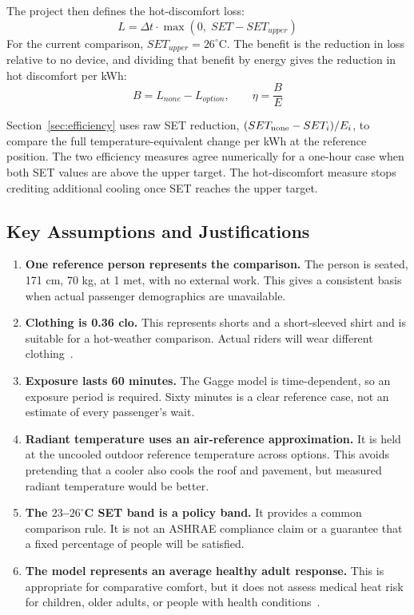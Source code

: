 The project then defines the hot-discomfort loss:
\begin{equation}
L = \Delta t \cdot \max\left(0,\; SET - SET_{upper}\right)
\end{equation}
For the current comparison, $SET_{upper} = 26^\circ$C. The benefit is the reduction in loss relative to no device, and dividing that benefit by energy gives the reduction in hot discomfort per kWh:
\begin{equation}
B = L_{none} - L_{option}, \qquad \eta = \frac{B}{E}
\end{equation}
 
Section~\ref{sec:efficiency} uses raw SET reduction, $(SET_{\rm none}-SET_i)/E_i$, to compare the full temperature-equivalent change per kWh at the reference position. The two efficiency measures agree numerically for a one-hour case when both SET values are above the upper target. The hot-discomfort measure stops crediting additional cooling once SET reaches the upper target.

\subsection{Key Assumptions and Justifications}
 
\begin{enumerate}
  \item \textbf{One reference person represents the comparison.} The person is seated, 171 cm, 70 kg, at 1 met, with no external work. This gives a consistent basis when actual passenger demographics are unavailable.
  \item \textbf{Clothing is 0.36 clo.} This represents shorts and a short-sleeved shirt and is suitable for a hot-weather comparison. Actual riders will wear different clothing~\cite{ashrae_2021_comfort}.
  \item \textbf{Exposure lasts 60 minutes.} The Gagge model is time-dependent, so an exposure period is required. Sixty minutes is a clear reference case, not an estimate of every passenger's wait.
  \item \textbf{Radiant temperature uses an air-reference approximation.} It is held at the uncooled outdoor reference temperature across options. This avoids pretending that a cooler also cools the roof and pavement, but measured radiant temperature would be better.
  \item \textbf{The $23$--$26^\circ$C SET band is a policy band.} It provides a common comparison rule. It is not an ASHRAE compliance claim or a guarantee that a fixed percentage of people will be satisfied.
  \item \textbf{The model represents an average healthy adult response.} This is appropriate for comparative comfort, but it does not assess medical heat risk for children, older adults, or people with health conditions~\cite{cbe_two_node}.
\end{enumerate}